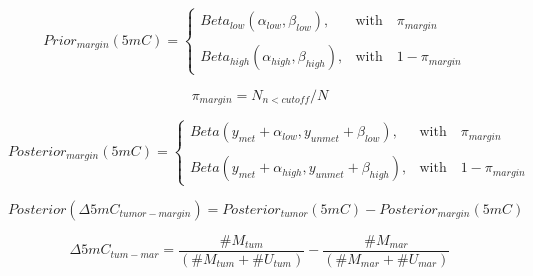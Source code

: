 \documentclass[a4paper]{article}
\begin{document}

\begin{equation*}
Prior_{margin}(5mC) = 
\begin{cases} 
Beta_{low}(\alpha_{low}, \beta_{low}), & \mbox{with } \mbox{ $\pi_{margin}$ } \\
\\
Beta_{high}(\alpha_{high}, \beta_{high}), & \mbox{with } \mbox{ $1 - \pi_{margin}$ }
\end{cases}
\end{equation*}

\begin{equation*}
\pi_{margin} = N_{n < cutoff} / N
\end{equation*}

\newpage

\begin{equation*}
Posterior_{margin}(5mC) = 
\begin{cases} 
Beta(y_{met} + \alpha_{low}, y_{unmet} + \beta_{low}) , & \mbox{with } \mbox{ $\pi_{margin}$ } \\
\\
Beta(y_{met} + \alpha_{high}, y_{unmet} + \beta_{high}), & \mbox{with } \mbox{ $1 - \pi_{margin}$ }
\end{cases}
\end{equation*}

\newpage

\begin{equation*}
Posterior(\Delta 5mC_{tumor - margin}) = Posterior_{tumor}(5mC) - Posterior_{margin}(5mC)
\end{equation*}

\newpage

\begin{equation*}
\Delta 5mC_{tum - mar} = \frac{\#M_{tum}}{(\#M_{tum} + \#U_{tum})} - 
    \frac{\#M_{mar}}{(\#M_{mar} + \#U_{mar})}
\end{equation*}
\end{document}
